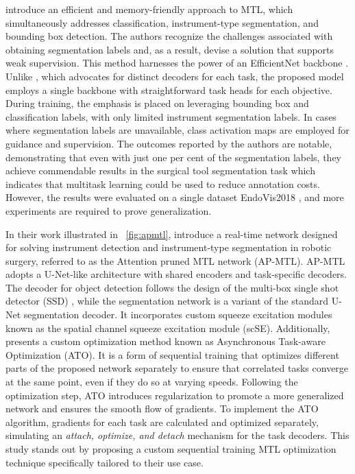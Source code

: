 \documentclass[times,twocolumn,final]{elsarticle}
\newcommand{\figref}[1]{\figurename~\ref{#1}}
\begin{document}
\citet{scalable_joint_detection} introduce an efficient and memory-friendly approach to MTL, which simultaneously addresses classification, instrument-type segmentation, and bounding box detection. The authors recognize the challenges associated with obtaining segmentation labels and, as a result, devise a solution that supports weak supervision.
This method harnesses the power of an EfficientNet backbone \citep{koonce2021efficientnet}. Unlike \citet{simultaneous_depth_tool_seg}, which advocates for distinct decoders for each task, the proposed model employs a single backbone with straightforward task heads for each objective. During training, the emphasis is placed on leveraging bounding box and classification labels, with only limited instrument segmentation labels. In cases where segmentation labels are unavailable, class activation maps are employed for guidance and supervision.
The outcomes reported by the authors are notable, demonstrating that even with just one per cent of the segmentation labels, they achieve commendable results in the surgical tool segmentation task which indicates that multitask learning could be used to reduce annotation costs. However, the results were evaluated on a single dataset EndoVis2018 \citep{endovis2018}, and more experiments are required to prove generalization. 


In their work illustrated in \figref{fig:apmtl}, \citet{islam2020apmtl} introduce a real-time network designed for solving instrument detection and instrument-type segmentation in robotic surgery, referred to as the Attention pruned MTL network (AP-MTL). AP-MTL adopts a U-Net-like architecture with shared encoders and task-specific decoders. The decoder for object detection follows the design of the multi-box single shot detector (SSD) \citep{ssd_multibox}, while the segmentation network is a variant of the standard U-Net segmentation decoder. It incorporates custom squeeze excitation modules \citep{squeeze_excitation} known as the spatial channel squeeze excitation module (scSE). 
Additionally, \citet{islam2020apmtl} presents a custom optimization method known as Asynchronous Task-aware Optimization (ATO). It is a form of sequential training that optimizes different parts of the proposed network separately to ensure that correlated tasks converge at the same point, even if they do so at varying speeds. Following the optimization step, ATO introduces regularization to promote a more generalized network and ensures the smooth flow of gradients. To implement the ATO algorithm, gradients for each task are calculated and optimized separately, simulating an \emph{attach, optimize, and detach} mechanism for the task decoders. 
This study stands out by proposing a custom sequential training MTL optimization technique specifically tailored to their use case.
\end{document}
